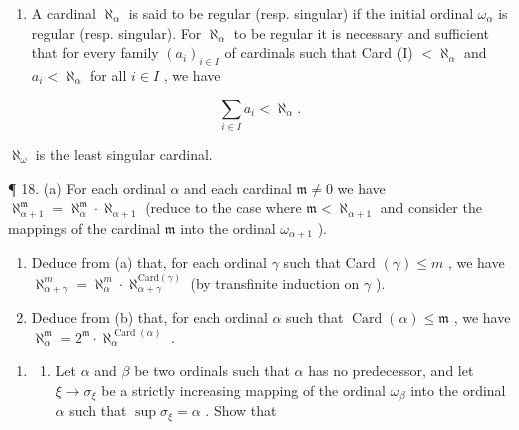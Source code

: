 \begin{enumerate}
\def\labelenumi{\arabic{enumi}.}
\setcounter{enumi}{16}
\tightlist
\item
  A cardinal \(\aleph_{\alpha}\) is said to be regular (resp. singular) if the initial ordinal \(\omega_{\alpha}\) is regular (resp. singular). For \(\aleph_{\alpha}\) to be regular it is necessary and sufficient that for every family \((a_{i})_{i\in I}\) of cardinals such that Card (I) \(< \aleph_{\alpha}\) and \(a_{i} < \aleph_{\alpha}\) for all \(i\in I\) , we have
\end{enumerate}

\[
\sum_ {i \in I} a _ {i} <   \aleph_ {\alpha}.
\]

\(\aleph_{\omega}\) is the least singular cardinal.

¶ 18. (a) For each ordinal \(\alpha\) and each cardinal \(\mathfrak{m} \neq 0\) we have \(\aleph_{\alpha+1}^{\mathfrak{m}} = \aleph_{\alpha}^{\mathfrak{m}} \cdot \aleph_{\alpha+1}\) (reduce to the case where \(\mathfrak{m} < \aleph_{\alpha+1}\) and consider the mappings of the cardinal \(\mathfrak{m}\) into the ordinal \(\omega_{\alpha+1}\) ).

\begin{enumerate}
\def\labelenumi{(\alph{enumi})}
\setcounter{enumi}{1}
\item
  Deduce from (a) that, for each ordinal \(\gamma\) such that Card \((\gamma) \leqslant m\) , we have \(\aleph_{\alpha + \gamma}^{m} = \aleph_{\alpha}^{m} \cdot \aleph_{\alpha + \gamma}^{\text{Card}(\gamma)}\) (by transfinite induction on \(\gamma\) ).
\item
  Deduce from (b) that, for each ordinal \(\alpha\) such that \(\operatorname{Card}(\alpha) \leqslant \mathfrak{m}\) , we have \(\aleph_{\alpha}^{\mathfrak{m}} = 2^{\mathfrak{m}} \cdot \aleph_{\alpha}^{\operatorname{Card}(\alpha)}\) .
\end{enumerate}

\begin{enumerate}
\def\labelenumi{\arabic{enumi}.}
\setcounter{enumi}{18}
\tightlist
\item
  \begin{enumerate}
  \def\labelenumii{(\alph{enumii})}
  \tightlist
  \item
    Let \(\alpha\) and \(\beta\) be two ordinals such that \(\alpha\) has no predecessor, and let \(\xi \to \sigma_{\xi}\) be a strictly increasing mapping of the ordinal \(\omega_{\beta}\) into the ordinal \(\alpha\) such that \(\sup \sigma_{\xi} = \alpha\) . Show that
  \end{enumerate}
\end{enumerate}

